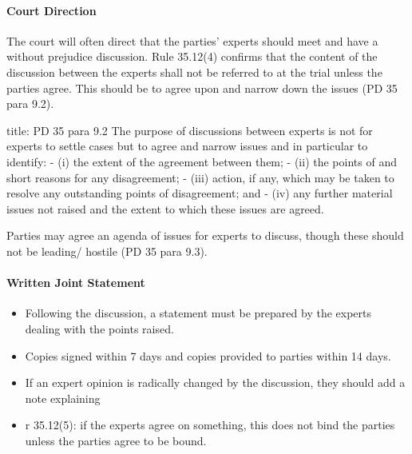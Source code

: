 \documentclass[
]{article}
\newenvironment{Shaded}{}{}
\newcommand{\NormalTok}[1]{#1}
\providecommand{\tightlist}{%
  \setlength{\itemsep}{0pt}\setlength{\parskip}{0pt}}
\begin{document}
\hypertarget{court-direction}{%
\paragraph{Court Direction}\label{court-direction}}

The court will often direct that the parties' experts should meet and
have a without prejudice discussion. Rule 35.12(4) confirms that the
content of the discussion between the experts shall not be referred to
at the trial unless the parties agree. This should be to agree upon and
narrow down the issues (PD 35 para 9.2).

\begin{Shaded}
\begin{Highlighting}[]
\NormalTok{title: PD 35 para 9.2}
\NormalTok{The purpose of discussions between experts is not for experts to settle cases but to agree and narrow issues and in particular to identify:}
\NormalTok{{-} (i) the extent of the agreement between them;}
\NormalTok{{-} (ii) the points of and short reasons for any disagreement;}
\NormalTok{{-} (iii) action, if any, which may be taken to resolve any outstanding points of disagreement; and}
\NormalTok{{-} (iv) any further material issues not raised and the extent to which these issues are agreed.}
\end{Highlighting}
\end{Shaded}

Parties may agree an agenda of issues for experts to discuss, though
these should not be leading/ hostile (PD 35 para 9.3).

\hypertarget{written-joint-statement}{%
\paragraph{Written Joint Statement}\label{written-joint-statement}}

\begin{itemize}
\tightlist
\item
  Following the discussion, a statement must be prepared by the experts
  dealing with the points raised.
\item
  Copies signed within 7 days and copies provided to parties within 14
  days.
\item
  If an expert opinion is radically changed by the discussion, they
  should add a note explaining
\item
  r 35.12(5): if the experts agree on something, this does not bind the
  parties unless the parties agree to be bound.
\end{itemize}
\end{document}
